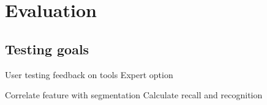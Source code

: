 \chapter{Evaluation} \label{ch5}

\section{Testing goals}

User testing feedback on tools
Expert option

Correlate feature with segmentation
Calculate recall and recognition
